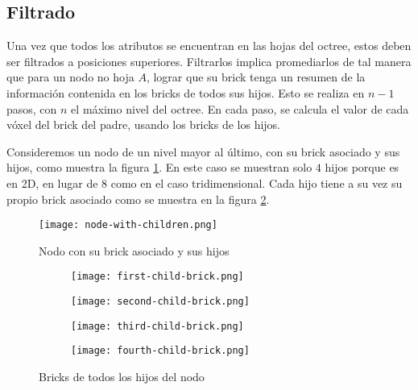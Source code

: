 

\subsection{Filtrado}\label{design:filtering}

Una vez que todos los atributos se encuentran en las hojas del octree, estos deben ser filtrados a posiciones superiores.
Filtrarlos implica promediarlos de tal manera que para un nodo no hoja $A$, lograr que su brick tenga un resumen de la información contenida en los bricks de todos sus hijos.
Esto se realiza en $n - 1$ pasos, con $n$ el máximo nivel del octree.
En cada paso, se calcula el valor de cada vóxel del brick del padre, usando los bricks de los hijos.

Consideremos un nodo de un nivel mayor al último, con su brick asociado y sus hijos, como muestra la figura \ref{fig:node_with_children}.
En este caso se muestran solo $4$ hijos porque es en 2D, en lugar de $8$ como en el caso tridimensional.
Cada hijo tiene a su vez su propio brick asociado como se muestra en la figura \ref{fig:all_child_bricks}.

\begin{figure}[h!]
    \centering
    \texttt{[image: node-with-children.png]}
    \caption{Nodo con su brick asociado y sus hijos}
    \label{fig:node_with_children}
\end{figure}

\begin{figure}[h!]
    \begin{center}
        \begin{subfigure}{.24\textwidth}
            \texttt{[image: first-child-brick.png]}
        \end{subfigure}
        \begin{subfigure}{.24\textwidth}
            \texttt{[image: second-child-brick.png]}
        \end{subfigure}
        \begin{subfigure}{.24\textwidth}
            \texttt{[image: third-child-brick.png]}
        \end{subfigure}
        \begin{subfigure}{.24\textwidth}
            \texttt{[image: fourth-child-brick.png]}
        \end{subfigure}
    \end{center}
    \caption{Bricks de todos los hijos del nodo}
    \label{fig:all_child_bricks}
\end{figure}

